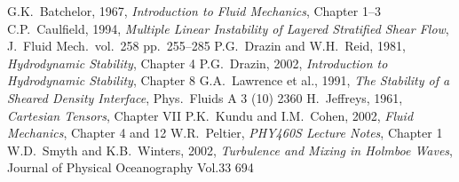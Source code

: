 \begin{thebibliography}{99}
 G.K.~Batchelor, 1967, \emph{Introduction to Fluid Mechanics},
Chapter 1--3
 C.P.~Caulfield, 1994, \emph{Multiple Linear
Instability of Layered Stratified Shear Flow}, J.~Fluid
Mech.~vol.~258 pp.~255--285
 P.G.~Drazin and W.H.~Reid, 1981, \emph{Hydrodynamic Stability},
Chapter 4
 P.G.~Drazin, 2002, \emph{Introduction to Hydrodynamic
Stability}, Chapter 8
 G.A.~Lawrence et al., 1991, \emph{The Stability of a Sheared Density Interface},
Phys.~Fluids A 3 (10) 2360
\newpage
{} H.~Jeffreys, 1961, \emph{Cartesian Tensors}, Chapter VII
 P.K.~Kundu and I.M.~Cohen, 2002, \emph{Fluid Mechanics}, Chapter
4 and 12
 W.R.~Peltier, \emph{PHY460S Lecture Notes}, Chapter 1
 W.D.~Smyth and K.B.~Winters, 2002, \emph{Turbulence and Mixing in Holmboe
Waves}, Journal of Physical Oceanography Vol.33 694
\end{thebibliography}
